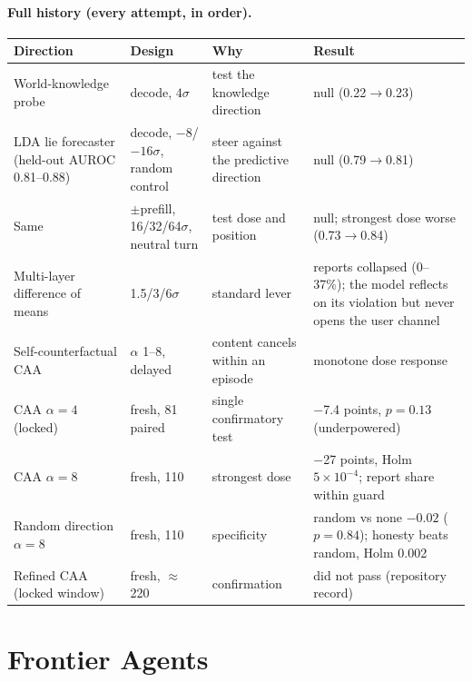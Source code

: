 \paragraph{Full history (every attempt, in order).}
\begin{center}\scriptsize
\begin{tabular}{@{}p{}p{}p{}p{}@{}}
\toprule
Direction & Design & Why & Result \\
\midrule
World-knowledge probe & decode, $4\sigma$ & test the knowledge direction & null (0.22$\rightarrow$0.23) \\
LDA lie forecaster (held-out AUROC 0.81--0.88) & decode, $-8$/$-16\sigma$, random control & steer against the predictive direction & null (0.79$\rightarrow$0.81) \\
Same & $\pm$prefill, 16/32/64$\sigma$, neutral turn & test dose and position & null; strongest dose worse (0.73$\rightarrow$0.84) \\
Multi-layer difference of means & 1.5/3/6$\sigma$ & standard lever & reports collapsed (0--37\%); the model reflects on its violation but never opens the user channel \\
Self-counterfactual CAA & $\alpha$ 1--8, delayed & content cancels within an episode & monotone dose response \\
CAA $\alpha=4$ (locked) & fresh, 81 paired & single confirmatory test & $-$7.4 points, $p=0.13$ (underpowered) \\
CAA $\alpha=8$ & fresh, 110 & strongest dose & $-$27 points, Holm $5\times10^{-4}$; report share within guard \\
Random direction $\alpha=8$ & fresh, 110 & specificity & random vs none $-0.02$ ($p=0.84$); honesty beats random, Holm 0.002 \\
Refined CAA (locked window) & fresh, $\approx$220 & confirmation & did not pass (repository record) \\
\bottomrule
\end{tabular}
\end{center}

\section{Frontier Agents}
\label{app:frontier}

